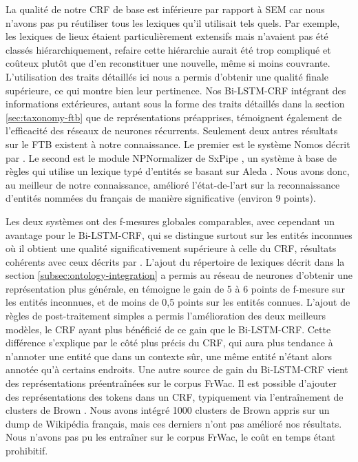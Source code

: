 \documentclass[12pt,a4paper,times,twoside,openright]{report}
\begin{document}
La qualité de notre CRF de base est inférieure par rapport à SEM \citep{dupont2014reconnaisseur} car nous n'avons pas pu réutiliser tous les lexiques qu'il utilisait tels quels. Par exemple, les lexiques de lieux étaient particulièrement extensifs mais n'avaient pas été classés hiérarchiquement, refaire cette hiérarchie aurait été trop compliqué et coûteux plutôt que d'en reconstituer une nouvelle, même si moins couvrante. L'utilisation des traits détaillés ici nous a permis d'obtenir une qualité finale supérieure, ce qui montre bien leur pertinence. Nos Bi-LSTM-CRF intégrant des informations extérieures, autant sous la forme des traits détaillés dans la section \ref{sec:taxonomy-ftb} que de représentations préapprises, témoignent également de l'efficacité des réseaux de neurones récurrents. Seulement deux autres résultats sur le FTB existent à notre connaissance. Le premier est le système Nomos décrit par \citet{stern2013identification}. Le second est le module NPNormalizer de SxPipe \citep{sagot2008sxpipe}, un système à base de règles qui utilise un lexique typé d'entités se basant sur Aleda \citep{sagot2012aleda}. Nous avons donc, au meilleur de notre connaissance, amélioré l'état-de-l'art sur la reconnaissance d'entités nommées du français de manière significative (environ 9 points).

Les deux systèmes ont des f-mesures globales comparables, avec cependant un avantage pour le Bi-LSTM-CRF, qui se distingue surtout sur les entités inconnues où il obtient une qualité significativement supérieure à celle du CRF, résultats cohérents avec ceux décrits par \citet{augenstein2017generalisation}. L'ajout du répertoire de lexiques décrit dans la section \ref{subsec:ontology-integration} a permis au réseau de neurones d'obtenir une représentation plus générale, en témoigne le gain de 5 à 6 points de f-mesure sur les entités inconnues, et de moins de 0,5 points sur les entités connues. L'ajout de règles de post-traitement simples a permis l'amélioration des deux meilleurs modèles, le CRF ayant plus bénéficié de ce gain que le Bi-LSTM-CRF. Cette différence s'explique par le côté plus précis du CRF, qui aura plus tendance à n'annoter une entité que dans un contexte sûr, une même entité n'étant alors annotée qu'à certains endroits. Une autre source de gain du Bi-LSTM-CRF vient des représentations préentraînées sur le corpus FrWac. Il est possible d'ajouter des représentations des tokens dans un CRF, typiquement via l'entraînement de clusters de Brown \citep{brown1992class}. Nous avons intégré 1000 clusters de Brown appris sur un dump de Wikipédia français, mais ces derniers n'ont pas amélioré nos résultats. Nous n'avons pas pu les entraîner sur le corpus FrWac, le coût en temps étant prohibitif.
\end{document}

